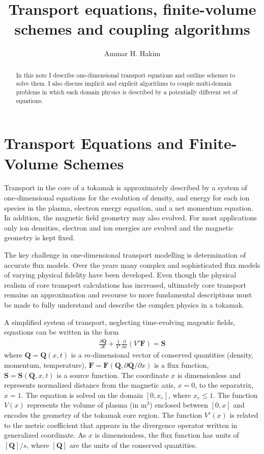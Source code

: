 \documentclass[reqno]{amsart}
\title{Transport equations, finite-volume schemes and coupling
  algorithms}%
\author{Ammar H. Hakim}%
\date{}
\newcommand{\pfrac}[2]{\frac{\partial #1}{\partial #2}}
\newcommand{\pfraca}[1]{\frac{\partial}{\partial #1}}
\newcommand{\pfracb}[2]{\partial #1/\partial #2}
\newcommand{\mvec}[1]{\mathbf{#1}}
\theoremstyle{definition}
\begin{document}

\begin{abstract}
  In this note I describe one-dimensional transport equations and
  outline schemes to solve them. I also discuss implicit and explicit
  algorithms to couple multi-domain problems in which each domain
  physics is described by a potentially different set of equations.
\end{abstract}

\maketitle

\section{Transport Equations and Finite-Volume Schemes}

Transport in the core of a tokamak is approximately described by a
system of one-dimensional equations for the evolution of density, and
energy for each ion species in the plasma, electron energy equation,
and a net momentum equation. In addition, the magnetic field geometry
may also evolved. For most applications only ion densities, electron
and ion energies are evolved and the magnetic geometry is kept fixed.

The key challenge in one-dimensional transport modelling is
determination of accurate flux models. Over the years many complex and
sophisticated flux models of varying physical fidelity have been
developed. Even though the physical realism of core transport
calculations has increased, ultimately core transport remains an
approximation and recourse to more fundamental descriptions must be
made to fully understand and describe the complex physics in a
tokamak.

A simplified system of transport, neglecting time-evolving magentic
fields, equations can be written in the form
\begin{align}
  \pfrac{\mvec{Q}}{t} 
  + \frac{1}{V'} \pfraca{x} \left( V' \mvec{F} \right) = \mvec{S}
  \label{eq:transport}
\end{align}
where $\mvec{Q} = \mvec{Q}(x,t)$ is a $m$-dimensional vector of
conserved quantities (density, momentum, temperature), $\mvec{F}
= \mvec{F}(\mvec{Q},\pfracb{\mvec{Q}}{x})$ is a flux function,
$\mvec{S} = \mvec{S}(\mvec{Q},x,t)$ is a source function. The
coordinate $x$ is dimensionless and represents normalized distance
from the magnetic axis, $x=0$, to the separatrix, $x=1$. The equation
is solved on the domain $[0,x_e]$, where $x_e \le 1$. The function
$V(x)$ represents the volume of plasma (in m$^3$) enclosed between
$[0,x]$ and encodes the geometry of the tokamak core region. The
function $V'(x)$ is related to the metric coefficient that appears in
the divergence operator written in generalized coordinate. As $x$ is
dimensionless, the flux function has units of $[\mvec{Q}]/s$, where
$[\mvec{Q}]$ are the units of the conserved quantities.
\end{document}
